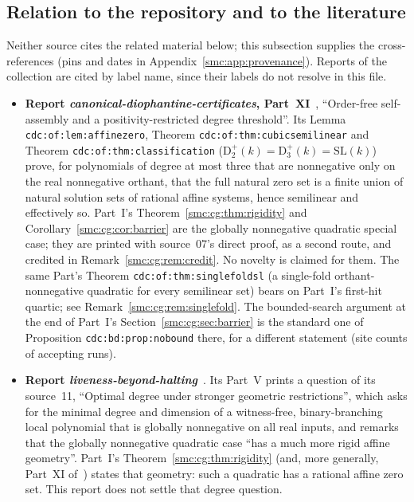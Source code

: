\documentclass[11pt,letterpaper]{article}
\numberwithin{equation}{section}
\theoremstyle{definition}
\theoremstyle{remark}
\begin{document}
\subsection{Relation to the repository and to the literature}\label{smc:sec:relation}

Neither source cites the related material below; this subsection supplies the cross-references (pins and dates in Appendix~\ref{smc:app:provenance}). Reports of the collection are cited by label name, since their labels do not resolve in this file.

\begin{itemize}
\item \textbf{Report \emph{canonical-diophantine-certificates}, Part~XI}~\cite{cdc}, ``Order-free self-assembly and a positivity-restricted degree threshold''. Its Lemma \texttt{cdc:of:lem:affinezero}, Theorem \texttt{cdc:of:thm:cubicsemilinear} and Theorem \texttt{cdc:of:thm:classification} ($\mathrm D^+_2(k)=\mathrm D^+_3(k)=\mathrm{SL}(k)$) prove, for polynomials of degree at most three that are nonnegative only on the real nonnegative orthant, that the full natural zero set is a finite union of natural solution sets of rational affine systems, hence semilinear and effectively so. Part~I's Theorem~\ref{smc:cg:thm:rigidity} and Corollary~\ref{smc:cg:cor:barrier} are the globally nonnegative quadratic special case; they are printed with source~07's direct proof, as a second route, and credited in Remark~\ref{smc:cg:rem:credit}. No novelty is claimed for them. The same Part's Theorem \texttt{cdc:of:thm:singlefoldsl} (a single-fold orthant-nonnegative quadratic for every semilinear set) bears on Part~I's first-hit quartic; see Remark~\ref{smc:cg:rem:singlefold}. The bounded-search argument at the end of Part~I's Section~\ref{smc:cg:sec:barrier} is the standard one of Proposition \texttt{cdc:bd:prop:nobound} there, for a different statement (site counts of accepting runs).
\item \textbf{Report \emph{liveness-beyond-halting}}~\cite{lbh}. Its Part~V prints a question of its source~11, ``Optimal degree under stronger geometric restrictions'', which asks for the minimal degree and dimension of a witness-free, binary-branching local polynomial that is globally nonnegative on all real inputs, and remarks that the globally nonnegative quadratic case ``has a much more rigid affine geometry''. Part~I's Theorem~\ref{smc:cg:thm:rigidity} (and, more generally, Part~XI of~\cite{cdc}) states that geometry: such a quadratic has a rational affine zero set. This report does not settle that degree question.

\end{itemize}
\end{document}
